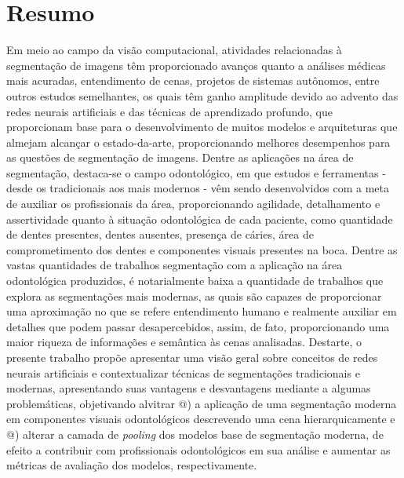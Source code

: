 \section*{Resumo}
\makeatletter
\newcommand*{\rom}[1]{\expandafter\@slowromancap\romannumeral #1@}
\makeatother
Em meio ao campo da visão computacional, atividades relacionadas à segmentação de imagens têm proporcionado avanços quanto a análises médicas mais acuradas, entendimento de cenas, projetos de sistemas autônomos, entre outros estudos semelhantes, os quais têm ganho amplitude devido ao advento das redes neurais artificiais e das técnicas de aprendizado profundo, que proporcionam base para o desenvolvimento de muitos modelos e arquiteturas que almejam alcançar o estado-da-arte, proporcionando melhores desempenhos para as questões de segmentação de imagens.
Dentre as aplicações na área de segmentação, destaca-se o campo odontológico, em que estudos e ferramentas - desde os tradicionais aos mais modernos - vêm sendo desenvolvidos com a meta de auxiliar os profissionais da área, proporcionando agilidade, detalhamento e assertividade quanto à situação odontológica de cada paciente, como quantidade de dentes presentes, dentes ausentes, presença de cáries, área de comprometimento dos dentes e componentes visuais presentes na boca. 
Dentre as vastas quantidades de trabalhos segmentação com a aplicação na área odontológica produzidos, é notarialmente baixa a quantidade de trabalhos que explora as segmentações mais modernas, as quais são capazes de proporcionar uma aproximação no que se refere entendimento humano e realmente auxiliar em detalhes que podem passar desapercebidos, assim, de fato, proporcionando uma maior riqueza de informações e semântica às cenas analisadas.
Destarte, o presente trabalho propõe apresentar uma visão geral sobre conceitos de redes neurais artificiais e contextualizar técnicas de segmentações tradicionais e modernas, apresentando suas vantagens e desvantagens mediante a algumas problemáticas, objetivando alvitrar \rom{1}) a aplicação de uma segmentação moderna em componentes visuais odontológicos descrevendo uma cena hierarquicamente e \rom{2}) alterar a camada de \textit{pooling} dos modelos base de segmentação moderna, de efeito a contribuir com profissionais odontológicos em sua análise e aumentar as métricas de avaliação dos modelos, respectivamente.
